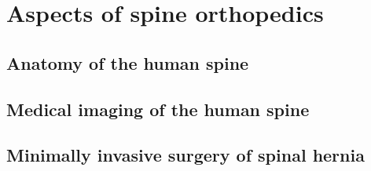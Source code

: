 \chapter{Aspects of spine orthopedics}

\section{Anatomy of the human spine}

\section{Medical imaging of the human spine}

\section{Minimally invasive surgery of spinal hernia}